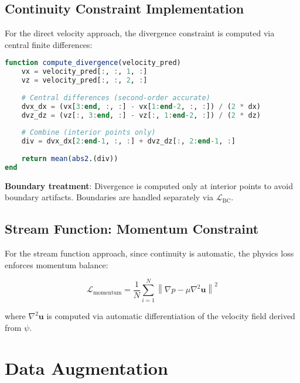 \subsection{Continuity Constraint Implementation}

For the direct velocity approach, the divergence constraint is computed via central finite differences:

\begin{lstlisting}[language=Julia, caption={GPU-compatible divergence computation}]
function compute_divergence(velocity_pred)
    vx = velocity_pred[:, :, 1, :]
    vz = velocity_pred[:, :, 2, :]
    
    # Central differences (second-order accurate)
    dvx_dx = (vx[3:end, :, :] - vx[1:end-2, :, :]) / (2 * dx)
    dvz_dz = (vz[:, 3:end, :] - vz[:, 1:end-2, :]) / (2 * dz)
    
    # Combine (interior points only)
    div = dvx_dx[2:end-1, :, :] + dvz_dz[:, 2:end-1, :]
    
    return mean(abs2.(div))
end
\end{lstlisting}

\textbf{Boundary treatment}: Divergence is computed only at interior points to avoid boundary artifacts. Boundaries are handled separately via $\mathcal{L}_{\text{BC}}$.

\subsection{Stream Function: Momentum Constraint}

For the stream function approach, since continuity is automatic, the physics loss enforces momentum balance:

\begin{equation}
\mathcal{L}_{\text{momentum}} = \frac{1}{N} \sum_{i=1}^{N} \left\|\nabla p - \mu \nabla^2 \mathbf{u}\right\|^2
\end{equation}

where $\nabla^2 \mathbf{u}$ is computed via automatic differentiation of the velocity field derived from $\psi$.

\section{Data Augmentation}
\label{sec:data_augmentation}


